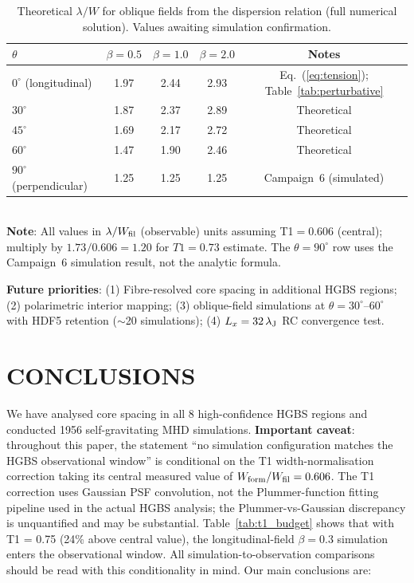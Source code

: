 \documentclass[twoside,twocolumn]{mnras}
\begin{document}
\begin{table}
\caption{Theoretical $\lambda/W$ for oblique fields from the \citet{Nakamura1993} dispersion relation (full numerical solution). Values awaiting simulation confirmation.}
\label{tab:oblique_theory}
\small
\begin{tabular}{lcccc}
\toprule
$\theta$ & $\beta=0.5$ & $\beta=1.0$ & $\beta=2.0$ & Notes \\
\midrule
$0^\circ$ (longitudinal) & 1.97 & 2.44 & 2.93 & Eq.~(\ref{eq:tension}); Table~\ref{tab:perturbative} \\
$30^\circ$ & 1.87 & 2.37 & 2.89 & Theoretical \\
$45^\circ$ & 1.69 & 2.17 & 2.72 & Theoretical \\
$60^\circ$ & 1.47 & 1.90 & 2.46 & Theoretical \\
$90^\circ$ (perpendicular) & 1.25 & 1.25 & 1.25 & Campaign~6 (simulated) \\
\bottomrule
\end{tabular}
\\ \footnotesize \textbf{Note}: All values in $\lambda/W_{\rm fil}$ (observable) units assuming T1$=0.606$ (central); multiply by $1.73/0.606=1.20$ for $T1=0.73$ estimate. The $\theta=90^\circ$ row uses the Campaign~6 simulation result, not the analytic formula.
\end{table}

\textbf{Future priorities}: (1) Fibre-resolved core spacing in additional HGBS regions; (2) polarimetric interior mapping; (3) oblique-field simulations at $\theta = 30^\circ$--$60^\circ$ with HDF5 retention ($\sim$20 simulations); (4) $L_x = 32\,\lambda_{\rm J}$ RC convergence test.

\section{CONCLUSIONS}

We have analysed core spacing in all 8 high-confidence HGBS regions and conducted
1956 self-gravitating MHD simulations. \textbf{Important caveat}: throughout this
paper, the statement ``no simulation configuration matches the HGBS observational
window'' is conditional on the T1 width-normalisation correction taking its central
measured value of $W_{\rm form}/W_{\rm fil} = 0.606$. The T1 correction uses Gaussian
PSF convolution, not the Plummer-function fitting pipeline used in the actual HGBS
analysis; the Plummer-vs-Gaussian discrepancy is unquantified and may be substantial.
Table~\ref{tab:t1_budget} shows that with T1 = 0.75 (24\% above central value), the
longitudinal-field $\beta = 0.3$ simulation enters the observational window. All
simulation-to-observation comparisons should be read with this conditionality in mind.
Our main conclusions are:
\end{document}
